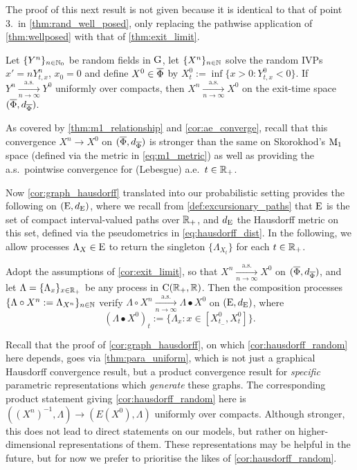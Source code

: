 The proof of this next result is not given because it is identical to that of point 3.~in \autoref{thm:rand_well_posed}, only replacing the pathwise application of \autoref{thm:wellposed} with that of \autoref{thm:exit_limit}.

\begin{corollary}\label{cor:exit_limit}
    Let $\{Y^n\}_{n\in\mathbb{N}_0}$ be random fields in $\mathrm{G}$, let $\{X^n\}_{n\in\mathbb{N}}$ solve the random IVPs $x'=nY^n_{t,x}$, $x_0=0$ and define $X^0\in\overline{\Phi}$ by $X^0_t:=\inf\{x>0:Y^0_{t,x}<0\}$. If $Y^n \xrightarrow[n\to\infty]{\mathrm{a.s.}}Y^0$ uniformly over compacts, then $X^n \xrightarrow[n\to\infty]{\mathrm{a.s.}} X^0$ on the exit-time space $(\overline{\Phi},d_{\overline{\Phi}})$.
\end{corollary}

As covered by \autoref{thm:m1_relationship} and \autoref{cor:ae_converge}, recall that this convergence $X^n \to X^0$ on $(\overline{\Phi},d_{\overline{\Phi}})$ is stronger than the same on Skorokhod's $\mathrm{M}_1$ space (defined via the metric in \autoref{eq:m1_metric}) as well as providing the a.s.~pointwise convergence for (Lebesgue) a.e.~$t\in\mathbb{R}_+$.

Now \autoref{cor:graph_hausdorff} translated into our probabilistic setting provides the following on $(\mathrm{E},d_{\mathrm{E}})$, where we recall from \autoref{def:excursionary_paths} that $\mathrm{E}$ is the set of compact interval-valued paths over $\mathbb{R}_+$, and $d_{\mathrm{E}}$ the Hausdorff metric on this set, defined via the pseudometrics in \autoref{eq:hausdorff_dist}. In the following, we allow processes $\Lambda_X\in\mathrm{E}$ to return the singleton $\{\Lambda_{X_t}\}$ for each $t\in\mathbb{R}_+$.

\begin{corollary}\label{cor:hausdorff_random}
    Adopt the assumptions of \autoref{cor:exit_limit}, so that $X^n \xrightarrow[n\to\infty]{\mathrm{a.s.}} X^0$ on $(\overline{\Phi},d_{\overline{\Phi}})$, and let $\Lambda=\{\Lambda_x\}_{x\in\mathbb{R}_+}$ be any process in $\mathrm{C}(\mathbb{R}_+,\mathbb{R})$. Then the composition processes $\{\Lambda\circ X^n:=\Lambda_{X^n}\}_{n\in\mathbb{N}}$ verify $\Lambda\circ X^n \xrightarrow[n\to\infty]{\mathrm{a.s.}} \Lambda\bullet X^0$ on $(\mathrm{E},d_{\mathrm{E}})$, where
    \begin{equation}
        (\Lambda\bullet X^0)_t := \{\Lambda_x:x\in[X^0_{t_-},X^0_t]\}.
    \end{equation}
\end{corollary}

Recall that the proof of \autoref{cor:graph_hausdorff}, on which \autoref{cor:hausdorff_random} here depends, goes via \autoref{thm:para_uniform}, which is not just a graphical Hausdorff convergence result, but a product convergence result for \emph{specific} parametric representations which \emph{generate} these graphs. The corresponding product statement giving \autoref{cor:hausdorff_random} here is $((X^n)^{-1},\Lambda)\to(E(X^0),\Lambda)$ uniformly over compacts. Although stronger, this does not lead to direct statements on our models, but rather on higher-dimensional representations of them. These representations may be helpful in the future, but for now we prefer to prioritise the likes of \autoref{cor:hausdorff_random}.

